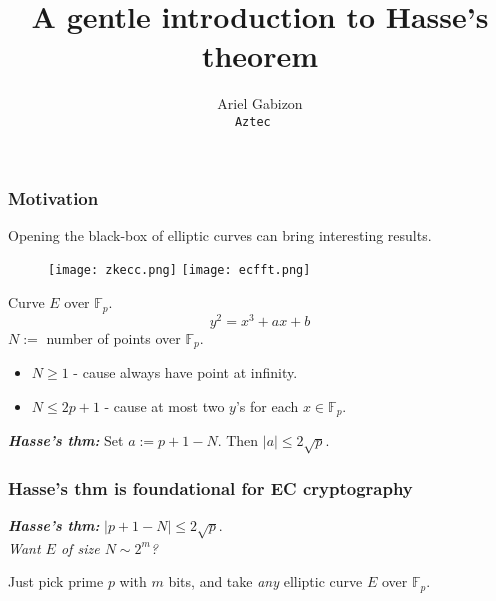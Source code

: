 \documentclass[shadesubsections,compress,14pt,mathserif]{beamer}
\title{\large{A gentle  introduction to Hasse's theorem}}    %
\author{{Ariel Gabizon}\\                 %
\tt{\small{Aztec} } }      %
\date{}                    %
\newcommand{\F}{\ensuremath{{\mathbb F}_p}}
\newcommand{\defeq}{\ensuremath{:=}}
\newcommand{\hl}[1]{\textbf{\textit{#1}}}
\newcommand{\nl}{\\ \pause \vspace{0.2in}}
\newcommand{\nlnp}{\\ \vspace{0.2in}}
\begin{document}
\boldmath
\begin{frame}
  \titlepage
\end{frame}



\begin{frame}
\frametitle{Motivation}
Opening the black-box of elliptic curves can 
bring interesting results.
 \begin{figure}
  \texttt{[image: zkecc.png]}
  \texttt{[image: ecfft.png]}
\end{figure}

\end{frame}
\begin{frame}
Curve $E$ over \F.
\[y^2=x^3+ax+b\]\pause
 $N\defeq$ number of points over \F.\pause
 \begin{itemize}
 \item $N\geq 1$ - cause always have point at infinity.\pause
 \item $N\leq 2p+1$ - cause at most two $y$'s for each $x\in \F$.\nl
\end{itemize}
\hl{Hasse's thm:} Set $a\defeq p+1-N$. Then $|a|\leq 2\sqrt p$.
\end{frame}
\begin{frame}
\frametitle{Hasse's thm is foundational for EC cryptography}
\hl{Hasse's thm:} $|p+1 -N|\leq 2\sqrt p$.\nlnp
\textit{Want $E$ of size $N\sim 2^m$?} \nl


Just pick prime $p$ with $m$ bits,
and take \emph{any} elliptic curve $E$ over \F.\nl

\end{frame}
\end{document}
